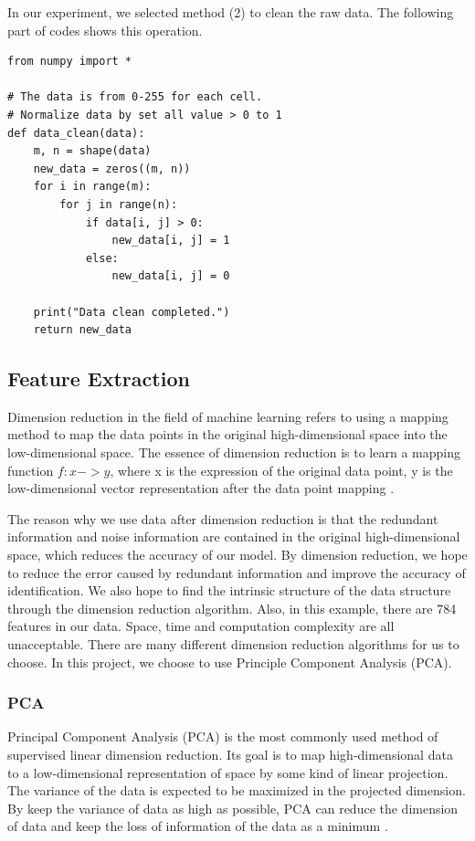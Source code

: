 \documentclass[sigconf]{acmart}
\begin{document}
In our experiment, we selected method (2) to clean the raw data. The following part of codes shows this operation.
\begin{lstlisting}
from numpy import *

# The data is from 0-255 for each cell.
# Normalize data by set all value > 0 to 1
def data_clean(data):
    m, n = shape(data)
    new_data = zeros((m, n))
    for i in range(m):
        for j in range(n):
            if data[i, j] > 0:
                new_data[i, j] = 1
            else:
                new_data[i, j] = 0
                
    print("Data clean completed.")
    return new_data
\end{lstlisting}

\subsection{Feature Extraction}

Dimension reduction in the field of machine learning refers to using a mapping method to map the data points in the original high-dimensional space into the low-dimensional space. The essence of dimension reduction is to learn a mapping function \(f:x->y\), where x is the expression of the original data point, y is the low-dimensional vector representation after the data point mapping \cite{feature_extra}. 

The reason why we use data after dimension reduction is that the redundant information and noise information are contained in the original high-dimensional space, which reduces the accuracy of our model. By dimension reduction, we hope to reduce the error caused by redundant information and improve the accuracy of identification. We also hope to find the intrinsic structure of the data structure through the dimension reduction algorithm. Also, in this example, there are 784 features in our data. Space, time and computation complexity are all unacceptable. There are many different dimension reduction algorithms for us to choose. In this project, we choose to use Principle Component Analysis (PCA).

\subsubsection{PCA}

Principal Component Analysis (PCA) is the most commonly used method of supervised linear dimension reduction. Its goal is to map high-dimensional data to a low-dimensional representation of space by some kind of linear projection. The variance of the data is expected to be maximized in the projected dimension. By keep the variance of data as high as possible, PCA can reduce the dimension of data and keep the loss of information of the data as a minimum \cite{PCA}.
\end{document}
